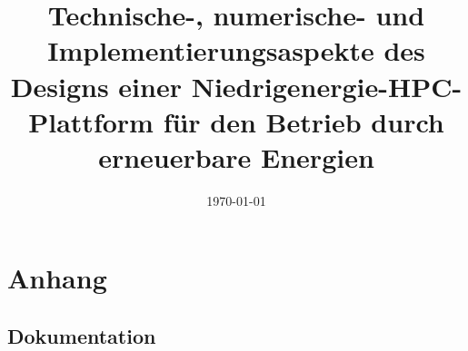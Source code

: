 \documentclass[12pt,a4paper, oneside,ngerman]{scrartcl}
\title{\large{Technische-, numerische- und Implementierungsaspekte des Designs einer Niedrigenergie-HPC-Plattform für den Betrieb durch erneuerbare Energien}}
\date{\today}
\begin{document}
\maketitle
\newpage
\tableofcontents
\newpage





%

\section{Anhang}

\subsection{Dokumentation}

\end{document}
